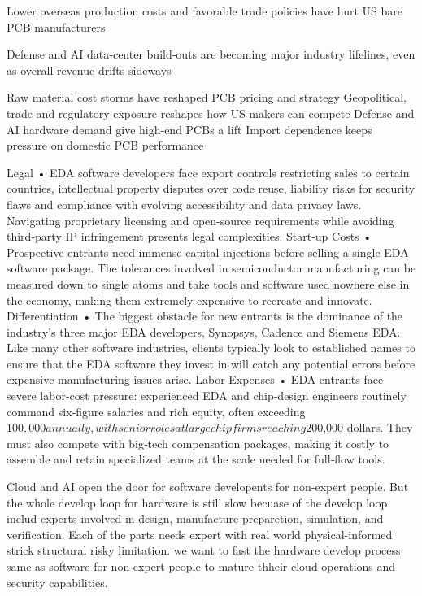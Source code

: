 Lower overseas production costs and favorable trade policies have hurt US bare PCB manufacturers

Defense and AI data‑center build‑outs are becoming major industry lifelines, even as overall revenue drifts sideways

Raw material cost storms have reshaped PCB pricing and strategy 
Geopolitical, trade and regulatory exposure reshapes how US makers can compete 
Defense and AI hardware demand give high‑end PCBs a lift 
Import dependence keeps pressure on domestic PCB performance 

Legal • EDA software developers face export controls restricting sales to certain countries, intellectual property disputes over code reuse, liability risks for security flaws and compliance with evolving accessibility and data privacy laws. Navigating proprietary licensing and open-source requirements while avoiding third-party IP infringement presents legal complexities. Start-up Costs • Prospective entrants need immense capital injections before selling a single EDA software package. The tolerances involved in semiconductor manufacturing can be measured down to single atoms and take tools and software used nowhere else in the economy, making them extremely expensive to recreate and innovate. Differentiation • The biggest obstacle for new entrants is the dominance of the industry's three major EDA developers, Synopsys, Cadence and Siemens EDA. Like many other software industries, clients typically look to established names to ensure that the EDA software they invest in will catch any potential errors before expensive manufacturing issues arise. Labor Expenses • EDA entrants face severe labor‑cost pressure: experienced EDA and chip‑design engineers routinely command six‑figure salaries and rich equity, often exceeding $100,000 annually, with senior roles at large chip firms reaching $200,000 dollars. They must also compete with big‑tech compensation packages, making it costly to assemble and retain specialized teams at the scale needed for full‑flow tools. 


Cloud and AI open the door for software developents for non-expert people. But the whole develop loop for hardware is still slow becuase of the develop loop includ experts involved in  design, manufacture preparetion,  simulation, and verification. Each of the parts needs expert with real world physical-informed strick structural risky limitation. we want to fast the hardware develop process same as software for non-expert people to mature thheir cloud operations and security capabilities.

